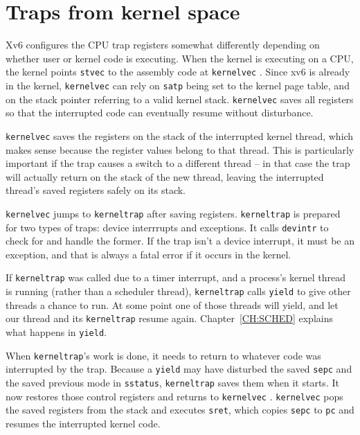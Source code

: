 \section{Traps from kernel space}

Xv6 configures the CPU trap registers somewhat differently depending
on whether user or kernel code is executing.
When the kernel is executing on a CPU, the kernel points {\tt stvec}
to the assembly code at {\tt kernelvec}
.
Since xv6 is already in the kernel, {\tt kernelvec} can rely
on {\tt satp} being set to the kernel page table, and on the
stack pointer referring to a valid kernel stack.
{\tt kernelvec} saves all registers so that the interrupted
code can eventually resume without disturbance.

{\tt kernelvec} saves the registers on the stack of the interrupted
kernel thread, which makes sense because the register values belong to
that thread. This is particularly important if the trap causes a
switch to a different thread -- in that case the trap will actually
return on the stack of the new thread, leaving the interrupted
thread's saved registers safely on its stack.

{\tt kernelvec} jumps to {\tt kerneltrap}
 after saving registers.
{\tt kerneltrap} is prepared for two types of traps:
device interrrupts and exceptions. It calls
{\tt devintr}
to check for and handle the former.
If the trap isn't a device interrupt, it must be an exception,
and that is always a fatal error if it occurs in the kernel.

If {\tt kerneltrap} was called due to a timer interrupt, and a
process's kernel thread is running (rather than a scheduler thread),
{\tt kerneltrap} calls {\tt yield} to give other threads a chance to
run. At some point one of those threads will yield, and let our thread
and its {\tt kerneltrap} resume again.
Chapter~\ref{CH:SCHED} explains what happens in {\tt yield}.

When {\tt kerneltrap}'s work is done, it needs to return to whatever
code was interrupted by the trap. Because a {\tt yield} may have
disturbed the saved {\tt sepc} and the saved previous mode in {\tt sstatus},
{\tt kerneltrap} saves them when it starts. It now restores those
control registers and returns to {\tt kernelvec}
.
{\tt kernelvec} pops the saved registers from the stack and
executes {\tt sret}, which copies {\tt sepc} to {\tt pc}
and resumes the interrupted kernel code.

